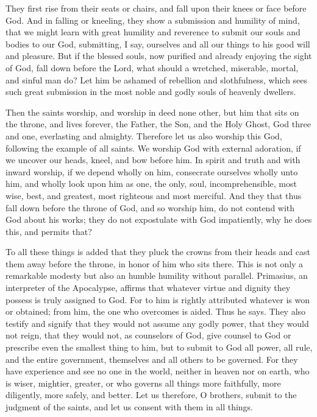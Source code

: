 They first rise from their seats or chairs, and fall upon their knees or face before God. And in falling or kneeling, they show a submission and humility of mind, that we might learn with great humility and reverence to submit our souls and bodies to our God, submitting, I say, ourselves and all our things to his good will and pleasure. But if the blessed souls, now purified and already enjoying the sight of God, fall down before the Lord, what should a wretched, miserable, mortal, and sinful man do? Let him be ashamed of rebellion and slothfulness, which sees such great submission in the most noble and godly souls of heavenly dwellers.

Then the saints worship, and worship in deed none other, but him that sits on the throne, and lives forever, the Father, the Son, and the Holy Ghost, God three and one, everlasting and almighty. Therefore let us also worship this God, following the example of all saints. We worship God with external adoration, if we uncover our heads, kneel, and bow before him. In spirit and truth and with inward worship, if we depend wholly on him, consecrate ourselves wholly unto him, and wholly look upon him as one, the only, soul, incomprehensible, most wise, best, and greatest, most righteous and most merciful. And they that thus fall down before the throne of God, and so worship him, do not contend with God about his works; they do not expostulate with God impatiently, why he does this, and permits that?

To all these things is added that they pluck the crowns from their heads and cast them away before the throne, in honor of him who sits there. This is not only a remarkable modesty but also an humble humility without parallel. Primasius, an interpreter of the Apocalypse, affirms that whatever virtue and dignity they possess is truly assigned to God. For to him is rightly attributed whatever is won or obtained; from him, the one who overcomes is aided. Thus he says. They also testify and signify that they would not assume any godly power, that they would not reign, that they would not, as counselors of God, give counsel to God or prescribe even the smallest thing to him, but to submit to God all power, all rule, and the entire government, themselves and all others to be governed. For they have experience and see no one in the world, neither in heaven nor on earth, who is wiser, mightier, greater, or who governs all things more faithfully, more diligently, more safely, and better. Let us therefore, O brothers, submit to the judgment of the saints, and let us consent with them in all things.

